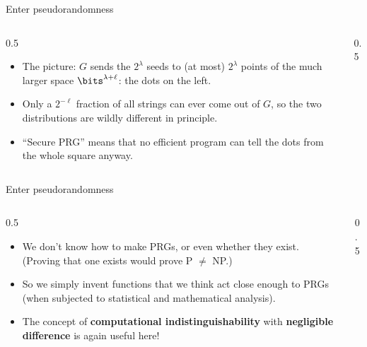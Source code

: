 \ifdefined\PRESENTATION\else\PassOptionsToClass{handout}{beamer}\fi\documentclass[aspectratio=169, lualatex]{beamer}
\begin{document}
\begin{frame}{Enter pseudorandomness}
	\begin{columns}[c]
		\begin{column}{0.5\textwidth}
			\begin{itemize}
				\item The picture: $G$ sends the $2^\lambda$ seeds to (at most) $2^\lambda$ points of the much larger space $\bits^{\lambda+\ell}$: the dots on the left.
				\item Only a $2^{-\ell}$ fraction of all strings can ever come out of $G$, so the two distributions are wildly different in principle.
				\item ``Secure PRG'' means that no efficient program can tell the dots from the whole square anyway.
			\end{itemize}
		\end{column}
		\begin{column}{0.5\textwidth}
		\end{column}
	\end{columns}
\end{frame}

\begin{frame}{Enter pseudorandomness}
	\begin{columns}[c]
		\begin{column}{0.5\textwidth}
			\begin{itemize}
				\item We don't know how to make PRGs, or even whether they exist. (Proving that one exists would prove P $\neq$ NP.)
				\item So we simply invent functions that we think act close enough to PRGs (when subjected to statistical and mathematical analysis).
				\item The concept of \textbf{computational indistinguishability} with \textbf{negligible difference} is again useful here!
			\end{itemize}
		\end{column}
		\begin{column}{0.5\textwidth}
		\end{column}
	\end{columns}
\end{frame}
\end{document}
